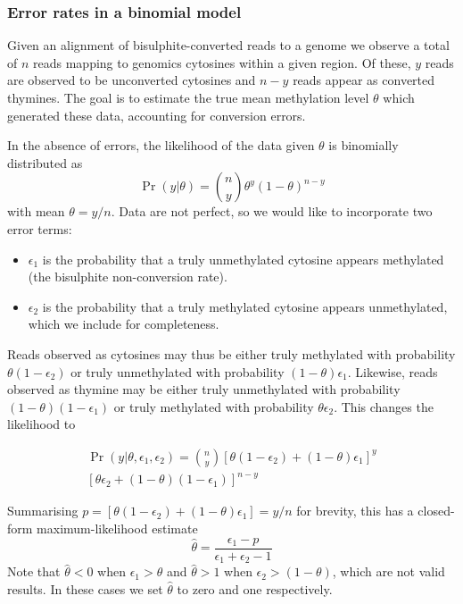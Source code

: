 \documentclass[10pt,draft,letterpaper]{article}
\begin{document}
\subsubsection*{Error rates in a binomial model} \label{sec:binomial-with-errors}

Given an alignment of bisulphite-converted reads to a genome we observe a total of $n$ reads mapping to genomics cytosines within a given region.
Of these, $y$ reads are observed to be unconverted cytosines and $n-y$ reads appear as converted thymines.
The goal is to estimate the true mean methylation level $\theta$ which generated these data, accounting for conversion errors.

In the absence of errors, the likelihood of the data given $\theta$ is binomially distributed as
\begin{equation}
    \label{eqn:classic-binomial}
    \Pr(y | \theta) = \binom{n}{y} \theta^y(1-\theta)^{n-y}
\end{equation}
with mean $\theta=y/n$.
Data are not perfect, so we would like to incorporate two error terms:
\begin{itemize}
    \item $\epsilon_1$ is the probability that a truly unmethylated cytosine appears methylated (the bisulphite non-conversion rate).
    \item $\epsilon_2$ is the probability that a truly methylated cytosine appears unmethylated, which we include for completeness.
\end{itemize}
Reads observed as cytosines may thus be either truly methylated with probability $\theta(1-\epsilon_2)$ or truly unmethylated with probability $(1-\theta)\epsilon_1$. Likewise, reads observed as thymine may be either truly unmethylated with probability $(1-\theta)(1-\epsilon_1)$ or truly methylated with probability $\theta \epsilon_2$.
This changes the likelihood to

\begin{equation}
\begin{split}
    \label{eqn:binom-with-errors}
    \Pr(y | \theta, \epsilon_1, \epsilon_2) = 
    {n \choose y}
    [\theta(1-\epsilon_2) + (1-\theta)\epsilon_1]^y \\
    [\theta \epsilon_2 + (1-\theta)(1-\epsilon_1)]^{n-y}
\end{split}
\end{equation}

Summarising $p=[\theta(1-\epsilon_2) + (1-\theta)\epsilon_1] = y/n$ for brevity, this has a closed-form maximum-likelihood estimate
\begin{equation}
    \label{eqn:ml-theta}
    \hat{\theta} = \frac{\epsilon_1-p}{\epsilon_1 + \epsilon_2 -1}
\end{equation}
Note that $\hat{\theta}<0$ when $\epsilon_1 > \theta$ and $\hat{\theta}>1$ when $\epsilon_2 > (1-\theta)$, which are not valid results.
In these cases we set $\hat{\theta}$ to zero and one respectively.
\end{document}
